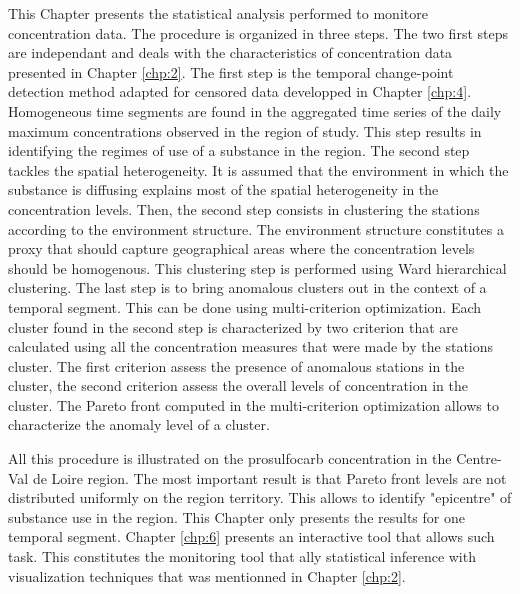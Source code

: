 This Chapter presents the statistical analysis performed to monitore concentration data. The procedure is organized in three steps. The two first steps are independant and deals with the characteristics of concentration data presented in Chapter \ref{chp:2}. The first step is the temporal change-point detection method adapted for censored data developped in Chapter \ref{chp:4}. Homogeneous time segments are found in the aggregated time series of the daily maximum concentrations observed in the region of study. This step results in identifying the regimes of use of a substance in the region. The second step tackles the spatial heterogeneity. It is assumed that the environment in which the substance is diffusing explains most of the spatial heterogeneity in the concentration levels. Then, the second step consists in clustering the stations according to the environment structure. The environment structure constitutes a proxy that should capture geographical areas where the concentration levels should be homogenous. This clustering step is performed using Ward hierarchical clustering. The last step is to bring anomalous clusters out in the context of a temporal segment. This can be done using multi-criterion optimization. Each cluster found in the second step is characterized by two criterion that are calculated using all the concentration measures that were made by the stations cluster. The first criterion assess the presence of anomalous stations in the cluster, the second criterion assess the overall levels of concentration in the cluster. The Pareto front computed in the multi-criterion optimization allows to characterize the anomaly level of a cluster.  

All this procedure is illustrated on the prosulfocarb concentration in the Centre-Val de Loire region. The most important result is that Pareto front levels are not distributed uniformly on the region territory. This allows to identify "epicentre" of substance use in the region. This Chapter only presents the results for one temporal segment. Chapter \ref{chp:6} presents an interactive tool that allows such task. This constitutes the monitoring tool that ally statistical inference with visualization techniques that was mentionned in Chapter \ref{chp:2}. 
 